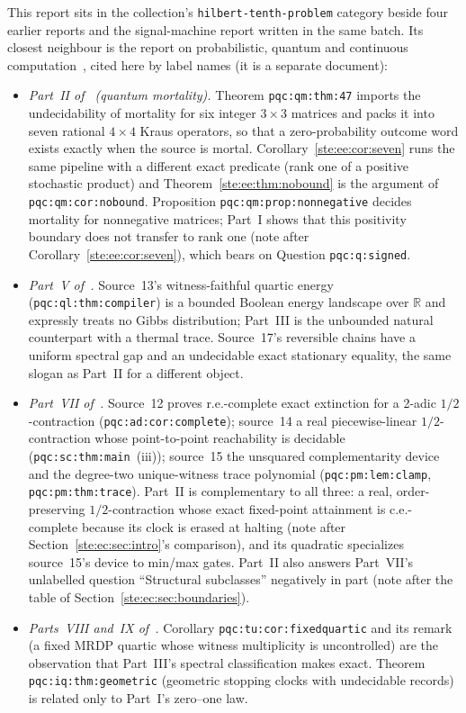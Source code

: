 \documentclass[11pt,letterpaper]{article}
\theoremstyle{definition}
\theoremstyle{remark}
\newcommand{\R}{\mathbb R}
\begin{document}
This report sits in the collection's \texttt{hilbert-tenth-problem} category beside four earlier reports and the signal-machine report written in the same batch. Its closest neighbour is the report on probabilistic, quantum and continuous computation~\cite{pqc}, cited here by label names (it is a separate document):
\begin{itemize}
\item \emph{Part~II of~\cite{pqc} (quantum mortality).} Theorem \texttt{pqc:qm:thm:47} imports the undecidability of mortality for six integer $3\times3$ matrices and packs it into seven rational $4\times4$ Kraus operators, so that a zero-probability outcome word exists exactly when the source is mortal. Corollary~\ref{ste:ee:cor:seven} runs the same pipeline with a different exact predicate (rank one of a positive stochastic product) and Theorem~\ref{ste:ee:thm:nobound} is the argument of \texttt{pqc:qm:cor:nobound}. Proposition \texttt{pqc:qm:prop:nonnegative} decides mortality for nonnegative matrices; Part~I shows that this positivity boundary does not transfer to rank one (note after Corollary~\ref{ste:ee:cor:seven}), which bears on Question \texttt{pqc:q:signed}.
\item \emph{Part~V of~\cite{pqc}.} Source~13's witness-faithful quartic energy (\texttt{pqc:ql:thm:compiler}) is a bounded Boolean energy landscape over $\R$ and expressly treats no Gibbs distribution; Part~III is the unbounded natural counterpart with a thermal trace. Source~17's reversible chains have a uniform spectral gap and an undecidable exact stationary equality, the same slogan as Part~II for a different object.
\item \emph{Part~VII of~\cite{pqc}.} Source~12 proves r.e.-complete exact extinction for a 2-adic $1/2$-contraction (\texttt{pqc:ad:cor:complete}); source~14 a real piecewise-linear $1/2$-contraction whose point-to-point reachability is decidable (\texttt{pqc:sc:thm:main}~(iii)); source~15 the unsquared complementarity device and the degree-two unique-witness trace polynomial (\texttt{pqc:pm:lem:clamp}, \texttt{pqc:pm:thm:trace}). Part~II is complementary to all three: a real, order-preserving $1/2$-contraction whose exact fixed-point attainment is c.e.-complete because its clock is erased at halting (note after Section~\ref{ste:ec:sec:intro}'s comparison), and its quadratic specializes source~15's device to min/max gates. Part~II also answers Part~VII's unlabelled question ``Structural subclasses'' negatively in part (note after the table of Section~\ref{ste:ec:sec:boundaries}).
\item \emph{Parts~VIII and~IX of~\cite{pqc}.} Corollary \texttt{pqc:tu:cor:fixedquartic} and its remark (a fixed MRDP quartic whose witness multiplicity is uncontrolled) are the observation that Part~III's spectral classification makes exact. Theorem \texttt{pqc:iq:thm:geometric} (geometric stopping clocks with undecidable records) is related only to Part~I's zero--one law.
\end{itemize}
\end{document}
